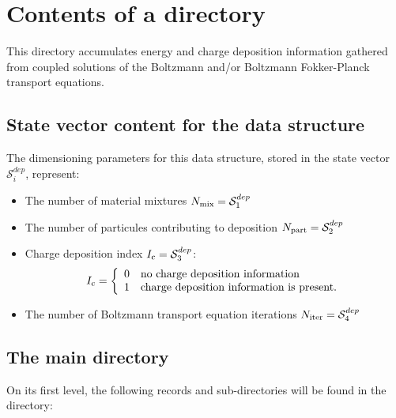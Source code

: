 \section{Contents of a  directory}\label{sect:depositiondir}

This directory accumulates energy and charge deposition information gathered from coupled solutions of the Boltzmann and/or Boltzmann
Fokker-Planck transport equations.

\subsection{State vector content for the  data structure}\label{sect:depositionstate}

The dimensioning parameters for this data structure, stored in the state vector
$\mathcal{S}^{dep}_{i}$, represent:

\begin{itemize}

\item The number of material mixtures $N_{\rm mix}=\mathcal{S}^{dep}_{1}$

\item The number of particules contributing to deposition $N_{\rm part}=\mathcal{S}^{dep}_{2}$

\item Charge deposition index $I_{\rm c}=\mathcal{S}^{dep}_{3}$:
\begin{displaymath}
I_{\rm c} = \left\{
\begin{array}{ll}
0 & \textrm{no charge deposition information}\\
1 & \textrm{charge deposition information is present.}
\end{array} \right.
\end{displaymath}

\item The number of Boltzmann transport equation iterations $N_{\rm iter}=\mathcal{S}^{dep}_{4}$
\end{itemize}

\subsection{The main  directory}\label{sect:depositiondirmain}

On its first level, the following records and sub-directories will be found in the  directory:

